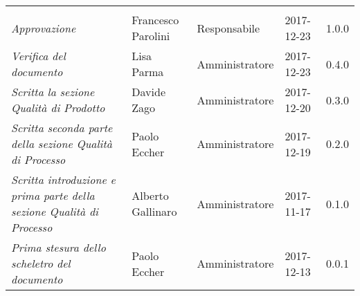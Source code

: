 \newpage 
\section*{}
\begin{table}[H]
	\centering
	\begin{tabular}{p{4cm}|C{3cm}|C{3cm}|R{2.5cm}|R{2cm}}
		
		 & & & & \\
		
		
		\emph{Approvazione}& Francesco Parolini & Responsabile & 2017-12-23 & 1.0.0 \\
		\hline
		
		\emph{Verifica del documento}& Lisa Parma & Amministratore & 2017-12-23 & 0.4.0 \\
		\hline
		
		\emph{Scritta la sezione Qualità di Prodotto}& Davide Zago & Amministratore & 2017-12-20 & 0.3.0 \\
		\hline
		
		\emph{Scritta seconda parte della sezione Qualità di Processo}& Paolo Eccher & Amministratore & 2017-12-19 & 0.2.0 \\
		\hline
		
		\emph{Scritta introduzione e prima parte della sezione Qualità di Processo} & Alberto Gallinaro & Amministratore & 2017-11-17 & 0.1.0 \\
		\hline
		
		\emph{Prima stesura dello scheletro del documento} & Paolo Eccher & Amministratore & 2017-12-13 & 0.0.1 \\
		
	\end{tabular}
	
\end{table}


\clearpage